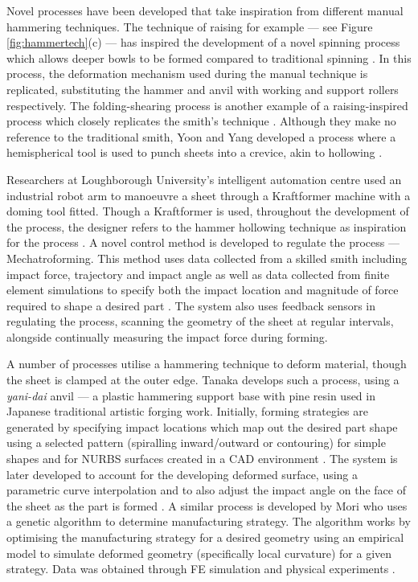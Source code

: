 Novel processes have been developed that take inspiration from different manual hammering techniques. The technique of raising for example --- see Figure \ref{fig:hammertech}(c) --- has inspired the development of a novel spinning process which allows deeper bowls to be formed compared to traditional spinning \citep{Russo2020RaisingSpinning}. In this process, the deformation mechanism used during the manual technique is replicated, substituting the hammer and anvil with working and support rollers respectively. The folding-shearing process is another example of a raising-inspired process which closely replicates the smith's technique \citep{Allwood2019Folding-shearing:Change}. Although they make no reference to the traditional smith, Yoon and Yang developed a process where a hemispherical tool is used to punch sheets into a crevice, akin to hollowing \citep{Yoon2001InvestigationMetal}. 

Researchers at Loughborough University's intelligent automation centre used an industrial robot arm to manoeuvre a sheet through a Kraftformer machine with a doming tool fitted. Though a Kraftformer is used, throughout the development of the process, the designer refers to the hammer hollowing technique as inspiration for the process \citep{Ilangovan2016FixturelessForming}. A novel control method is developed to regulate the process --- Mechatroforming. This method uses data collected from a skilled smith including impact force, trajectory and impact angle as well as data collected from finite element simulations to specify both the impact location and magnitude of force required to shape a desired part \citep{Ilangovan2016AnForming}. The system also uses feedback sensors in regulating the process, scanning the geometry of the sheet at regular intervals, alongside continually measuring the impact force during forming.

A number of processes utilise a hammering technique to deform material, though the sheet is clamped at the outer edge. Tanaka develops such a process, using a \textit{yani-dai} anvil --- a plastic hammering support base with pine resin used in Japanese traditional artistic forging work. Initially, forming strategies are generated by specifying impact locations which map out the desired part shape using a selected pattern (spiralling inward/outward or contouring) for simple shapes \citep{Tanaka2005DevelopmentWorking} and for NURBS surfaces created in a CAD environment \citep{Tanaka2012DevelopmentSystem}. The system is later developed to account for the developing deformed surface, using a parametric curve interpolation  \citep{Asakawa2010DevelopmentProcess} and to also adjust the impact angle on the face of the sheet as the part is formed \citep{Takasugi2012DevelopmentShape}. A similar process is developed by Mori who uses a genetic algorithm to determine manufacturing strategy. The algorithm works by optimising the manufacturing strategy for a desired geometry using an empirical model to simulate deformed geometry (specifically local curvature) for a given strategy. Data was obtained through FE simulation and physical experiments \citep{Mori1996DeterminationAlgorithm}. 

